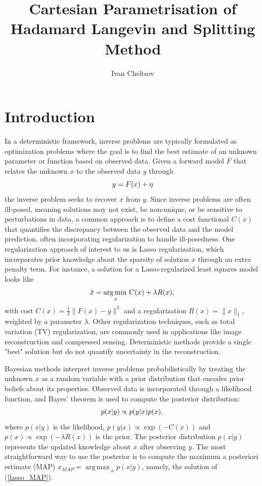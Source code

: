 \documentclass{article}
\title{Cartesian Parametrisation of Hadamard Langevin and Splitting Method}
\author{%
 Ivan Cheltsov
}
\DeclareMathOperator*{\argmax}{arg\,max\,}
\DeclareMathOperator*{\argmin}{arg\,min\,}
\begin{document}
\maketitle
\section{Introduction}
In a deterministic framework, inverse problems are typically formulated as optimization problems where the goal is to find the best estimate of an unknown parameter or function based on observed data. Given a forward model $F$ that relates the unknown $x$ to the observed data $y$ through 
\begin{equation} \label{lasso_MAP}
y=F(x) + \eta \\
\end{equation}
the inverse problem seeks to recover $x$ from $y$. Since inverse problems are often ill-posed, meaning solutions may not exist, be non-unique, or be sensitive to perturbations in data, a common approach is to define a cost functional $C(x)$ that quantifies the discrepancy between the observed data and the model prediction, often incorporating regularization to handle ill-posedness. One regularization approach of interest to us is Lasso regularization, which incorporates prior knowledge about the sparsity of solution $x$ through an extra penalty term. For instance, a solution for a Lasso-regularized least squares model looks like
\begin{equation} \label{lasso_MAP}
\hat{x} = \argmin_{x} C(x) +\lambda R(x), \\
\end{equation}
with cost $C(x) = \frac{1}{2}\|F(x) - y\|^2$ and a regularization $R(x) = \|x\|_1$, weighted by a parameter $\lambda$. Other regularization techniques, such as total variation (TV) regularization, are commonly used in applications like image reconstruction and compressed sensing. Deterministic methods provide a single "best" solution but do not quantify uncertainty in the reconstruction.

Bayesian methods interpret inverse problems probabilistically by treating the unknown $x$ as a random variable with a prior distribution that encodes prior beliefs about its properties. Observed data is incorporated through a likelihood function, and Bayes’ theorem is used to compute the posterior distribution:
\begin{equation} \label{lasso_bayes}
p(x | y) \propto p(y | x)p(x), \\
\end{equation}
where $p(x | y)$ is the likelihood, $p(y | x) \propto \exp(-C(x))$ and $p(x) \propto \exp(-\lambda R(x))$ is the prior. The posterior distribution $p(x | y)$ represents the updated knowledge about $x$ after observing $y$. The most straightforward way to use the posterior is to compute the maximum a posteriori estimate (MAP) $x_{MAP} = \argmax_{x} p(x | y)$, namely, the solution of (\ref{lasso_MAP}).
\end{document}
